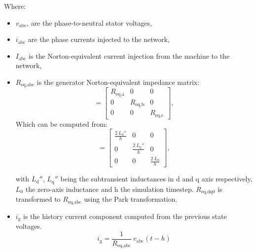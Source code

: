 Where:
\begin{itemize}
    \item $v_{\text{abc}}$,  are the phase-to-neutral stator voltages,
    \item $i_{\text{abc}}$ are the phase currents injected to the network,
    \item $I_{\text{abc}}$ is the Norton-equivalent current injection from the machine to the network,
    \item $R_{\text{eq,abc}}$ is the generator Norton-equivalent impedance matrix:
    \begin{equation}
        [R_{\text{eq,abc}}] =
        \begin{bmatrix}
            R_{\text{eq,a}} & 0         & 0         \\
            0         & R_{\text{eq,b}} & 0         \\
            0         & 0         & R_{\text{eq,c}}
        \end{bmatrix},
    \end{equation}
    Which can be computed from:
    \begin{equation}
        [R_{\text{eq,dq0}}] =\begin{bmatrix}
            \frac{2~L_\text{d}''}{h} & 0         & 0         \\
            0         & \frac{2~L_\text{q}''}{h} & 0         \\
            0         & 0         & \frac{2~L_\text{0}}{h}
        \end{bmatrix},
    \end{equation}

    with  $L_\text{d}''$, $L_\text{q}''$ being the subtransient inductances in d and q axis respectively, $L_0$ the zero-axis inductance and h the simulation timestep.
    $R_{\text{eq,dq0}}$ is transformed to $R_{\text{eq,abc}}$ using the Park transformation.
    \item $i_\text{g}$ is the history current component computed from the previous state voltages.
    \begin{equation}
        i_\text{g} = \frac{1}{R_{\text{eq,abc}}}~v_{\text{abc}}(t-h)
    \end{equation}
\end{itemize}


